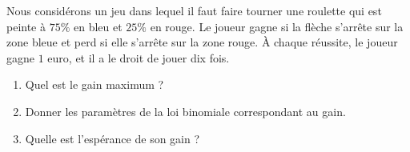 
\begin{exercice}\label{exoPremiere-0094}

    \begin{multicols}{2}
   Nous considérons un jeu dans lequel il faut faire tourner une roulette qui est peinte à \( 75\%\) en bleu et \( 25\%\) en rouge.  Le joueur gagne si la flèche s'arrête sur la zone bleue et perd si elle s'arrête sur la zone rouge. À chaque réussite, le joueur gagne \( 1\) euro, et il a le droit de jouer dix fois.

   \begin{enumerate}
       \item
           Quel est le gain maximum ?
       \item
           Donner les paramètres de la loi binomiale correspondant au gain.
       \item
           Quelle est l'espérance de son gain ?
   \end{enumerate}

\columnbreak

\begin{center}

\end{center}

    \end{multicols}

\end{exercice}
